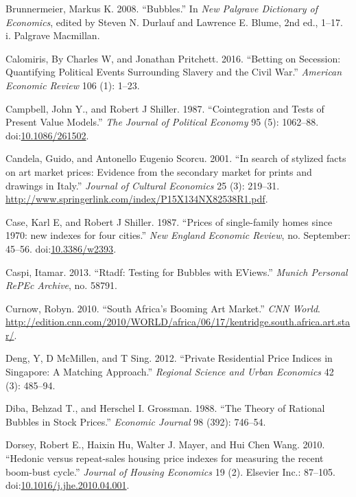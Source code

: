 \documentclass[]{elsarticle} %
\begin{document}
\hypertarget{ref-Brunnermeier2008}{}
Brunnermeier, Markus K. 2008. ``Bubbles.'' In \emph{New Palgrave
Dictionary of Economics}, edited by Steven N. Durlauf and Lawrence E.
Blume, 2nd ed., 1--17. i. Palgrave Macmillan.

\hypertarget{ref-Calomiris2016}{}
Calomiris, By Charles W, and Jonathan Pritchett. 2016. ``Betting on
Secession: Quantifying Political Events Surrounding Slavery and the
Civil War.'' \emph{American Economic Review} 106 (1): 1--23.

\hypertarget{ref-Campbell1987}{}
Campbell, John Y., and Robert J Shiller. 1987. ``Cointegration and Tests
of Present Value Models.'' \emph{The Journal of Political Economy} 95
(5): 1062--88.
doi:\href{https://doi.org/10.1086/261502}{10.1086/261502}.

\hypertarget{ref-Candela2001}{}
Candela, Guido, and Antonello Eugenio Scorcu. 2001. ``In search of
stylized facts on art market prices: Evidence from the secondary market
for prints and drawings in Italy.'' \emph{Journal of Cultural Economics}
25 (3): 219--31.
\url{http://www.springerlink.com/index/P15X134NX82538R1.pdf}.

\hypertarget{ref-Case1987}{}
Case, Karl E, and Robert J Shiller. 1987. ``Prices of single-family
homes since 1970: new indexes for four cities.'' \emph{New England
Economic Review}, no. September: 45--56.
doi:\href{https://doi.org/10.3386/w2393}{10.3386/w2393}.

\hypertarget{ref-Caspi2013}{}
Caspi, Itamar. 2013. ``Rtadf: Testing for Bubbles with EViews.''
\emph{Munich Personal RePEc Archive}, no. 58791.

\hypertarget{ref-Curnow2010}{}
Curnow, Robyn. 2010. ``South Africa's Booming Art Market.'' \emph{CNN
World}.
\url{http://edition.cnn.com/2010/WORLD/africa/06/17/kentridge.south.africa.art.star/}.

\hypertarget{ref-Deng2012}{}
Deng, Y, D McMillen, and T Sing. 2012. ``Private Residential Price
Indices in Singapore: A Matching Approach.'' \emph{Regional Science and
Urban Economics} 42 (3): 485--94.

\hypertarget{ref-Diba1988}{}
Diba, Behzad T., and Herschel I. Grossman. 1988. ``The Theory of
Rational Bubbles in Stock Prices.'' \emph{Economic Journal} 98 (392):
746--54.

\hypertarget{ref-Dorsey2010}{}
Dorsey, Robert E., Haixin Hu, Walter J. Mayer, and Hui Chen Wang. 2010.
``Hedonic versus repeat-sales housing price indexes for measuring the
recent boom-bust cycle.'' \emph{Journal of Housing Economics} 19 (2).
Elsevier Inc.: 87--105.
doi:\href{https://doi.org/10.1016/j.jhe.2010.04.001}{10.1016/j.jhe.2010.04.001}.
\end{document}
